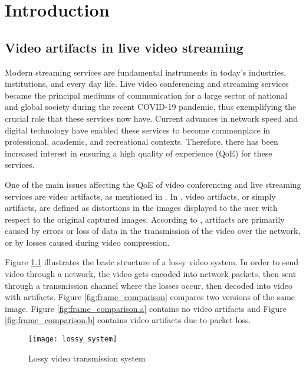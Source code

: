
\chapter{Introduction}
\label{chp:intro}

\section{Video artifacts in live video streaming}
\label{sec:intro_artifacts}

Modern streaming services are fundamental instruments in today's industries, institutions, and every day life. Live video conferencing and streaming services became the principal mediums of communication for a large sector of national and global society during the recent COVID-19 pandemic, thus exemplifying the crucial role that these services now have. Current advances in network speed and digital technology have enabled these services to become commonplace in professional, academic, and recreational contexts. Therefore, there has been increased interest in ensuring a high quality of experience (QoE) for these services.

One of the main issues affecting the QoE of video conferencing and live streaming services are video artifacts, as mentioned in \cite{Vranjes2018, Korhonen2018}. In \cite{Greengrass2009}, video artifacts, or simply artifacts, are defined as distortions in the images displayed to the user with respect to the original captured images. According to \cite{Vranjes2018}, artifacts are primarily caused by errors or loss of data in the transmission of the video over the network, or by losses caused during video compression.

Figure \ref{fig:lossy_system} illustrates the basic structure of a lossy video system. In order to send video through a network, the video gets encoded into network packets, then sent through a transmission channel where the losses occur, then decoded into video with artifacts. Figure \ref{fig:frame_comparison} compares two versions of the same image. Figure \ref{fig:frame_comparison.a} contains no video artifacts and Figure \ref{fig:frame_comparison.b} contains video artifacts due to packet loss.

\begin{figure} [!h]
  \centering
  
  \texttt{[image: lossy\_system]}
  
  \caption{Lossy video transmission system}
  \label{fig:lossy_system}

\end{figure}

